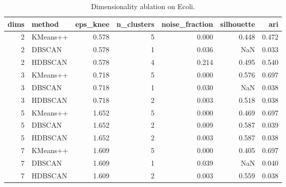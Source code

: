 \begin{table}[t]
\caption{Dimensionality ablation on Ecoli.}
\label{tab:dims}
\begin{tabular}{rlrrrrr}
\toprule
dims & method & eps\_knee & n\_clusters & noise\_fraction & silhouette & ari \\
\midrule
2 & KMeans++ & 0.578 & 5 & 0.000 & 0.448 & 0.472 \\
2 & DBSCAN & 0.578 & 1 & 0.036 & NaN & 0.033 \\
2 & HDBSCAN & 0.578 & 4 & 0.214 & 0.495 & 0.540 \\
3 & KMeans++ & 0.718 & 5 & 0.000 & 0.576 & 0.697 \\
3 & DBSCAN & 0.718 & 1 & 0.030 & NaN & 0.038 \\
3 & HDBSCAN & 0.718 & 2 & 0.003 & 0.518 & 0.038 \\
5 & KMeans++ & 1.652 & 5 & 0.000 & 0.469 & 0.697 \\
5 & DBSCAN & 1.652 & 2 & 0.009 & 0.587 & 0.039 \\
5 & HDBSCAN & 1.652 & 2 & 0.003 & 0.587 & 0.038 \\
7 & KMeans++ & 1.609 & 5 & 0.000 & 0.405 & 0.697 \\
7 & DBSCAN & 1.609 & 1 & 0.039 & NaN & 0.040 \\
7 & HDBSCAN & 1.609 & 2 & 0.003 & 0.559 & 0.038 \\
\bottomrule
\end{tabular}
\end{table}
